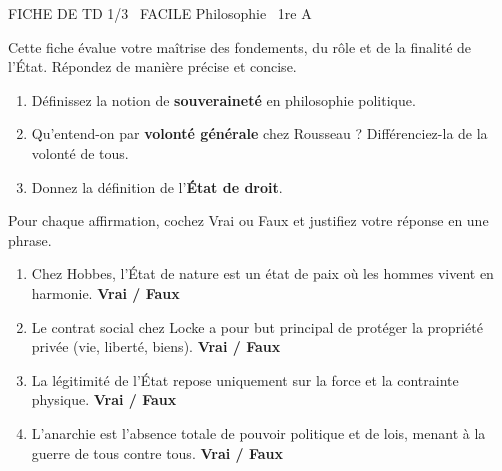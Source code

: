 \documentclass[11pt]{article}
\begin{document}
\begin{tcolorbox}[enhanced,colback=popink,colframe=popink,arc=10pt,boxrule=0pt,left=12pt,right=12pt,top=9pt,bottom=9pt]
{\color{white}\popxbold\small FICHE DE TD 1/3 \textbullet\ FACILE \hfill Philosophie \textbullet\ 1re A\par}
\end{tcolorbox}
\vspace{4pt}
Cette fiche évalue votre maîtrise des fondements, du rôle et de la finalité de l'État. Répondez de manière précise et concise.

\begin{exercice}
\begin{enumerate}
    \item Définissez la notion de \textbf{souveraineté} en philosophie politique.
    \item Qu'entend-on par \textbf{volonté générale} chez Rousseau ? Différenciez-la de la volonté de tous.
    \item Donnez la définition de l'\textbf{État de droit}.
\end{enumerate}
\end{exercice}

\begin{exercice}
Pour chaque affirmation, cochez Vrai ou Faux et justifiez votre réponse en une phrase.
\begin{enumerate}
    \item Chez Hobbes, l'État de nature est un état de paix où les hommes vivent en harmonie. \hfill \textbf{Vrai / Faux}
    \item Le contrat social chez Locke a pour but principal de protéger la propriété privée (vie, liberté, biens). \hfill \textbf{Vrai / Faux}
    \item La légitimité de l'État repose uniquement sur la force et la contrainte physique. \hfill \textbf{Vrai / Faux}
    \item L'anarchie est l'absence totale de pouvoir politique et de lois, menant à la guerre de tous contre tous. \hfill \textbf{Vrai / Faux}
\end{enumerate}
\end{exercice}
\end{document}
